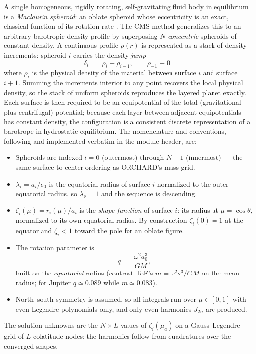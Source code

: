\documentclass{aastex631}
\begin{document}
A single homogeneous, rigidly rotating, self-gravitating fluid body in
equilibrium is a \emph{Maclaurin spheroid}: an oblate spheroid whose
eccentricity is an exact, classical function of its rotation rate
\citep{Chandrasekhar1969}.  The CMS method generalizes this to an
arbitrary barotropic density profile by superposing $N$ \emph{concentric}
spheroids of constant density.  A continuous profile $\rho(r)$ is
represented as a stack of density increments: spheroid $i$ carries the
density \emph{jump}
\begin{equation}
\delta_i \;=\; \rho_i - \rho_{i-1}, \qquad \rho_{-1} \equiv 0,
\label{eq:delta}
\end{equation}
where $\rho_i$ is the physical density of the material between surface
$i$ and surface $i+1$.  Summing the increments interior to any point
recovers the local physical density, so the stack of uniform spheroids
reproduces the layered planet exactly.  Each surface is then required to
be an equipotential of the total (gravitational plus centrifugal)
potential; because each layer between adjacent equipotentials has
constant density, the configuration is a consistent discrete
representation of a barotrope in hydrostatic equilibrium.  The
nomenclature and conventions, following \citet{Hubbard2013} and
implemented verbatim in the module header, are:
\begin{itemize}
\item Spheroids are indexed $i = 0$ (outermost) through $N-1$
  (innermost) --- the same surface-to-center ordering as ORCHARD's mass
  grid.
\item $\lambda_i = a_i / a_0$ is the equatorial radius of surface $i$
  normalized to the outer equatorial radius, so $\lambda_0 = 1$ and the
  sequence is descending.
\item $\zeta_i(\mu) = r_i(\mu)/a_i$ is the \emph{shape function} of
  surface $i$: its radius at $\mu = \cos\theta$, normalized to its own
  equatorial radius.  By construction $\zeta_i(0) = 1$ at the equator and
  $\zeta_i < 1$ toward the pole for an oblate figure.
\item The rotation parameter is
  \begin{equation}
  q \;=\; \frac{\omega^2 a_0^3}{GM},
  \label{eq:q}
  \end{equation}
  built on the \emph{equatorial} radius (contrast ToF's
  $m = \omega^2 s^3/GM$ on the mean radius; for Jupiter $q \simeq 0.089$
  while $m \simeq 0.083$).
\item North--south symmetry is assumed, so all integrals run over
  $\mu \in [0,1]$ with even Legendre polynomials only, and only even
  harmonics $J_{2n}$ are produced.
\end{itemize}
The solution unknowns are the $N \times L$ values of $\zeta_i(\mu_a)$ on
a Gauss--Legendre grid of $L$ colatitude nodes; the harmonics follow from
quadratures over the converged shapes.
\end{document}
